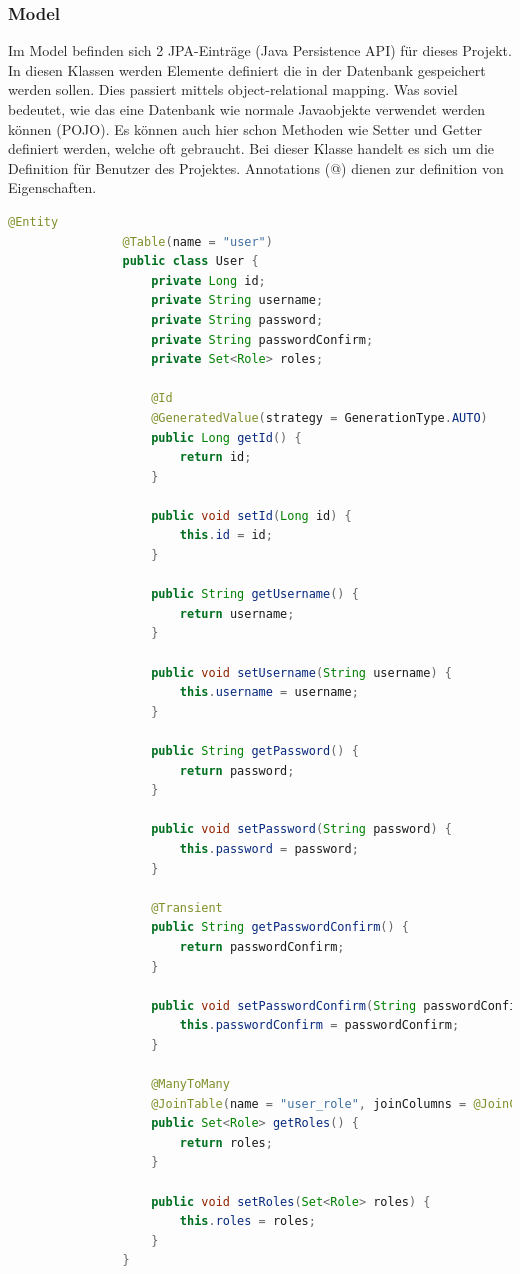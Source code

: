         \subsubsection{Model}
            Im Model befinden sich 2 JPA-Einträge (Java Persistence API) für dieses Projekt. In diesen Klassen werden Elemente deﬁniert die in der Datenbank gespeichert werden sollen. Dies passiert mittels object-relational mapping. Was soviel bedeutet, wie das eine Datenbank wie normale Javaobjekte verwendet werden können (POJO). Es können auch hier schon Methoden wie Setter und Getter deﬁniert werden, welche oft gebraucht. Bei dieser Klasse handelt es sich um die Deﬁnition für Benutzer des Projektes. Annotations (@) dienen zur deﬁnition von Eigenschaften. 
            \begin{lstlisting}[language = java]
                @Entity
                @Table(name = "user")
                public class User {
                    private Long id;
                    private String username;
                    private String password;
                    private String passwordConfirm;
                    private Set<Role> roles;
                
                    @Id
                    @GeneratedValue(strategy = GenerationType.AUTO)
                    public Long getId() {
                        return id;
                    }
                
                    public void setId(Long id) {
                        this.id = id;
                    }
                
                    public String getUsername() {
                        return username;
                    }
                
                    public void setUsername(String username) {
                        this.username = username;
                    }
                
                    public String getPassword() {
                        return password;
                    }
                
                    public void setPassword(String password) {
                        this.password = password;
                    }
                
                    @Transient
                    public String getPasswordConfirm() {
                        return passwordConfirm;
                    }
                
                    public void setPasswordConfirm(String passwordConfirm) {
                        this.passwordConfirm = passwordConfirm;
                    }
                
                    @ManyToMany
                    @JoinTable(name = "user_role", joinColumns = @JoinColumn(name = "user_id"), inverseJoinColumns = @JoinColumn(name = "role_id"))
                    public Set<Role> getRoles() {
                        return roles;
                    }
                
                    public void setRoles(Set<Role> roles) {
                        this.roles = roles;
                    }
                }
            \end{lstlisting}
